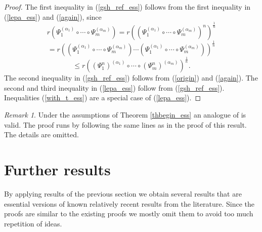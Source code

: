 \documentclass[12pt, reqno]{amsart}
\theoremstyle{definition}
\theoremstyle{remark}
\newtheorem{remark}[theorem]{Remark}
\numberwithin{equation}{section}
\newcommand{\be}{\begin{equation}}
\newcommand{\ee}{\end{equation}}
\begin{document}
\begin{proof}
The  first inequality in (\ref{gsh_ref_ess}) follows from the  first inequality in (\ref{lepa_ess}) and (\ref{again}), since
$$r (\Psi _1 ^{( \alpha _1)} \circ \cdots \circ \Psi _m ^{(\alpha _m)} ) = r \left( \left(\Psi _1 ^{( \alpha _1)} \circ \cdots \circ \Psi _m ^{(\alpha _m)} \right)^n \right)^{\frac{1}{n}}  $$
$$= r ((\Psi _1 ^{( \alpha _1)} \circ \cdots \circ \Psi _m ^{(\alpha _m)})\cdots (\Psi _1 ^{( \alpha _1)} \circ \cdots \circ \Psi _m ^{(\alpha _m)}))^{\frac{1}{n}} $$
$$\le  r ((\Psi _1 ^n ) ^{( \alpha _1)} \circ \cdots \circ (\Psi _m ^n) ^{(\alpha _m)} ) ^{ \frac{1}{n}}.$$
The second inequality in (\ref{gsh_ref_ess}) follows from (\ref{origin}) and (\ref{again}). 
The second and third inequality in (\ref{lepa_ess}) follow from  (\ref{gsh_ref_ess}). Inequalities 
(\ref{with_t_ess}) are a special case of (\ref{lepa_ess}).
\end{proof}

\begin{remark}{\rm Under the assumptions of Theorem \ref{thbegin_ess} an analogue of \cite[Theorem 3.4]{BP21} is valid. The proof runs by following the same lines as in the proof of this result. The details are omitted.
}
\end{remark}

\section{Further results}

By applying results of the previous section we obtain several results that are essential versions of known relatively recent results from the literature. Since the proofs are similar to the existing proofs we mostly omit them  to avoid too much repetition of ideas.
\end{document}

